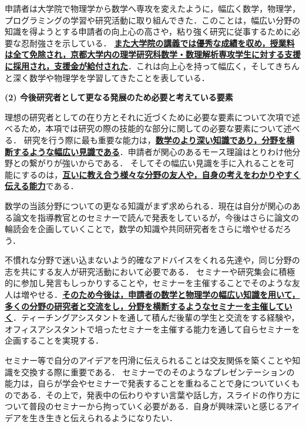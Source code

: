 \documentclass[11pt,a4j,dvipdfmx]{jarticle} 					%
\newcommand{\研究課題名}{象の卵}
\newcommand{\研究機関名}{京都大学}
\newcommand{\研究代表者氏名}{福士　謙二　　　}
\begin{document}
\noindent
{}

申請者は大学院で物理学から数学へ専攻を変えたように，幅広く数学，物理学，プログラミングの学習や研究活動に取り組んできた．このことは，幅広い分野の知識を得ようとする申請者の向上心の高さや，粘り強く研究に従事するために必要な忍耐強さを示している．
\textbf{\ul{また大学院の講義では優秀な成績を収め，授業料は全て免除され，京都大学内の理学研究科数学・数理解析専攻学生に対する支援に採用され，支援金が給付された}}．これは向上心を持って幅広く，そしてきちんと深く数学や物理学を学習してきたことを表している．



\vspace{5mm}
\noindent
\textbf{(2) 今後研究者として更なる発展のため必要と考えている要素}

理想の研究者としての在り方とそれに近づくために必要な要素について次項で述べるため，本項では研究の際の技能的な部分に関しての必要な要素について述べる．
研究を行う際に最も重要な能力は，\textbf{\ul{数学のより深い知識であり，分野を横断するような幅広い見識である}}．申請者が関心のあるモース理論はとりわけ他分野との繋がりが強いからである．
そしてその幅広い見識を手に入れることを可能にするのは，\textbf{\ul{互いに教え合う様々な分野の友人や，自身の考えをわかりやすく伝える能力}}である．


\noindent
{}

数学の当該分野についての更なる知識がまず求められる．現在は自分が関心のある論文を指導教官とのセミナーで読んで発表をしているが，今後はさらに論文の輪読会を企画していくことで，数学の知識や共同研究者をさらに増やせるだろう．



\noindent
{}

不慣れな分野で迷い込まないよう的確なアドバイスをくれる先達や，同じ分野の志を共にする友人が研究活動において必要である．
セミナーや研究集会に積極的に参加し発言もしっかりすることや，セミナーを主催することでそのような友人は増やせる．\textbf{\ul{そのため今後は，申請者の数学と物理学の幅広い知識を用いて，多くの分野の研究者と交流をし，分野を横断するようなセミナーを主催していく}}．ティーチングアシスタントを通して積んだ後輩の学生と交流をする経験や，オフィスアシスタントで培ったセミナーを主催する能力を通して自らセミナーを企画することを実現する．



\noindent
{}

セミナー等で自分のアイデアを円滑に伝えられることは交友関係を築くことや知識を交換する際に重要である．
セミナーでのそのようなプレゼンテーションの能力は，自らが学会やセミナーで発表することを重ねることで身についていくものである．その上で，発表中の伝わりやすい言葉や話し方，スライドの作り方について普段のセミナーから拘っていく必要がある．自身が興味深いと感じるアイデアを生き生きと伝えられるようになりたい．
\end{document}
